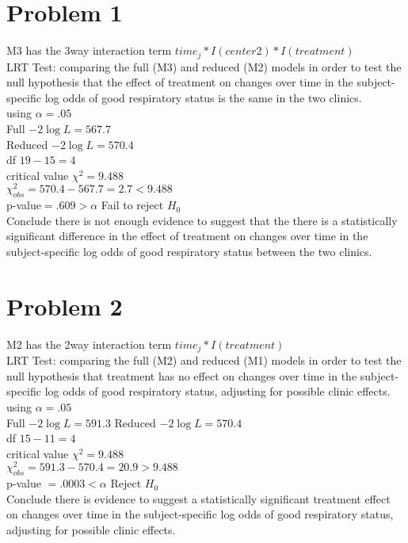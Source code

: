 \documentclass{article}
\begin{document}
\begin{flushleft}

\section*{Problem 1}
M3 has the 3way interaction term $time_j*I(center2)*I(treatment)$\\
LRT Test: comparing the full (M3) and reduced (M2) models in order to test the null hypothesis that the effect of treatment on changes over time in the subject-specific log odds of good respiratory status is the same in the two clinics.\\
using $\alpha=.05$\\
Full $-2\log L=567.7$\\
Reduced $-2\log L=570.4$\\
df $19-15=4$\\
critical value $\chi^2=9.488$\\
$\chi^2_{obs}=570.4-567.7=2.7<9.488$\\
 p-value$=.609>\alpha$ Fail to reject $H_0$\\
Conclude there is not enough evidence to suggest that the there is a statistically significant difference in the effect of treatment on changes over time in the subject-specific log odds of good respiratory status between the two clinics.
\section*{Problem 2}
M2 has the 2way interaction term $time_j*I(treatment)$\\
LRT Test: comparing the full (M2) and reduced (M1) models in order to test the null hypothesis that treatment has no effect
on changes over time in the subject-specific log odds of good respiratory status, adjusting for possible clinic effects.\\
using $\alpha=.05$\\
Full $-2\log L=591.3$
Reduced $-2\log L=570.4$\\
df $15-11=4$\\
critical value $\chi^2=9.488$\\
$\chi^2_{obs}=591.3-570.4=20.9>9.488$\\
p-value $=.0003<\alpha$ Reject $H_0$\\
Conclude there is evidence to suggest a statistically significant treatment effect on changes over time in the subject-specific log odds of good respiratory status, adjusting for possible clinic effects.\\

\end{flushleft}
\end{document}
